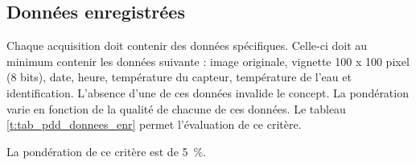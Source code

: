 

\subsection{Données enregistrées}
\label{s:cdc_pdd_donnees_enre}

Chaque acquisition doit contenir des données spécifiques. Celle-ci doit au minimum contenir les données suivante : image originale, vignette 100 x 100 pixel (8 bits), date, heure,  température du capteur, température de l’eau et identification. L’absence d’une de ces données invalide le concept. La pondération varie en fonction de la qualité de chacune de ces données. Le tableau \ref{t:tab_pdd_donnees_enr} permet l’évaluation de ce critère.



La pondération de ce critère est de 5~\%.